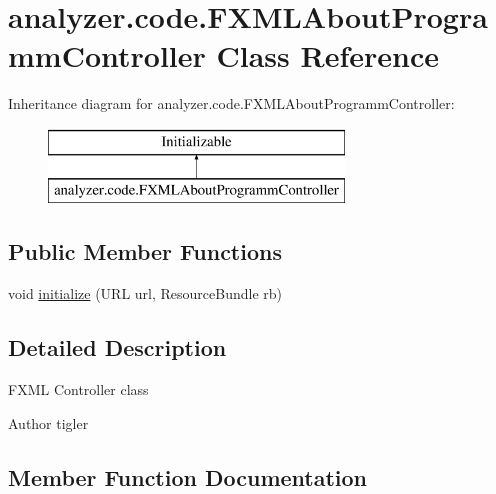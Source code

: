 \hypertarget{classanalyzer_1_1code_1_1FXMLAboutProgrammController}{}\section{analyzer.\+code.\+F\+X\+M\+L\+About\+Programm\+Controller Class Reference}
\label{classanalyzer_1_1code_1_1FXMLAboutProgrammController}
Inheritance diagram for analyzer.\+code.\+F\+X\+M\+L\+About\+Programm\+Controller\+:\begin{figure}[H]
\begin{center}
\leavevmode
\includegraphics[height=2.000000cm]{classanalyzer_1_1code_1_1FXMLAboutProgrammController}
\end{center}
\end{figure}
\subsection*{Public Member Functions}
\begin{DoxyCompactItemize}
\item 
void \hyperlink{classanalyzer_1_1code_1_1FXMLAboutProgrammController_aa4aaf33b2bb1bb10d95af39c294dbec8}{initialize} (U\+RL url, Resource\+Bundle rb)
\end{DoxyCompactItemize}


\subsection{Detailed Description}
F\+X\+ML Controller class

\begin{DoxyAuthor}{Author}
tigler 
\end{DoxyAuthor}


\subsection{Member Function Documentation}
\mbox{\label{classanalyzer_1_1code_1_1FXMLAboutProgrammController_aa4aaf33b2bb1bb10d95af39c294dbec8}} 
